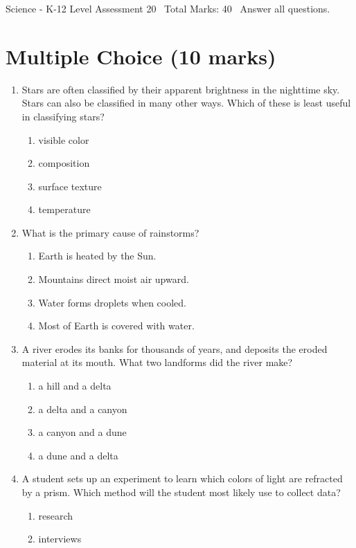 \documentclass[12pt]{article}
\begin{document}
\begin{center}
Science - K-12 Level Assessment 20 \
Total Marks: 40 \
Answer all questions.
\end{center}

\section*{Multiple Choice (10 marks)}
\begin{enumerate}[label=\arabic*.]
\item Stars are often classified by their apparent brightness in the nighttime sky. Stars can also be classified in many other ways. Which of these is least useful in classifying stars?
\begin{enumerate}[label=(\alph*)]
    \item visible color
    \item composition
    \item surface texture
    \item temperature
\end{enumerate}
\item What is the primary cause of rainstorms?
\begin{enumerate}[label=(\alph*)]
    \item Earth is heated by the Sun.
    \item Mountains direct moist air upward.
    \item Water forms droplets when cooled.
    \item Most of Earth is covered with water.
\end{enumerate}
\item A river erodes its banks for thousands of years, and deposits the eroded material at its mouth. What two landforms did the river make?
\begin{enumerate}[label=(\alph*)]
    \item a hill and a delta
    \item a delta and a canyon
    \item a canyon and a dune
    \item a dune and a delta
\end{enumerate}
\item A student sets up an experiment to learn which colors of light are refracted by a prism. Which method will the student most likely use to collect data?
\begin{enumerate}[label=(\alph*)]
    \item research
    \item interviews

\end{enumerate}
\end{enumerate}
\end{document}
